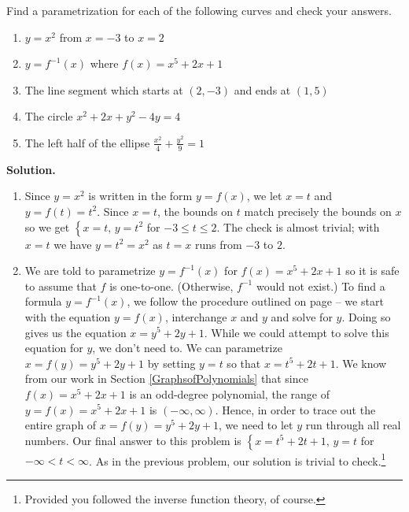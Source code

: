 \begin{ex} \label{recttoparametric}  Find a parametrization for each of the following curves and check your answers.

\begin{enumerate}

\item $y = x^2$ from $x = -3$ to $x = 2$

\item  $y = f^{-1}(x)$ where $f(x) = x^5 + 2x + 1$

\item  The line segment which starts at $(2,-3)$ and ends at $(1,5)$

\item  The circle $x^2 + 2x + y^2 - 4y = 4$

\item  The left half of the ellipse $\frac{x^2}{4} + \frac{y^2}{9} = 1$

\end{enumerate}

{\bf Solution.} 

\begin{enumerate}

\item  Since $y = x^2$ is written in the form $y = f(x)$, we let $x = t$ and $y = f(t) = t^2$.  Since $x=t$, the bounds on $t$ match precisely the bounds on $x$ so we get $\left\{ x = t, \, y = t^2 \right.$ for $-3 \leq t \leq 2$.  The check is almost trivial; with $x=t$ we have $y = t^2 = x^2$ as $t = x$ runs from $-3$ to $2$.

\item  We are told to parametrize $y = f^{-1}(x)$ for $f(x) = x^5 + 2x + 1$ so it is safe to assume that $f$ is one-to-one.  (Otherwise, $f^{-1}$ would not exist.)  To find a formula $y = f^{-1}(x)$, we follow the procedure outlined on page \pageref{inverseprocedure} -- we start with the equation $y = f(x)$, interchange $x$ and $y$ and solve for $y$.  Doing so gives us the equation $x = y^5+2y+1$.  While we could attempt to solve this equation for $y$, we don't need to.  We can parametrize $x = f(y) = y^5+2y+1$ by setting $y = t$ so that $x = t^5 + 2t + 1$.  We know from our work in Section \ref{GraphsofPolynomials} that since $f(x) = x^5 + 2x + 1$ is an odd-degree polynomial, the range of $y = f(x) = x^5 + 2x + 1$ is $(-\infty, \infty)$.  Hence, in order to trace out the entire graph of  $x = f(y) = y^5+2y+1$, we need to let $y$ run through all real numbers.  Our final answer to this problem is $\left\{ x = t^5+2t+1, \, y = t \right.$ for $-\infty < t < \infty$.  As in the previous problem, our solution is trivial to check.\footnote{Provided you followed the inverse function theory, of course.}


\end{enumerate}
\end{ex}
